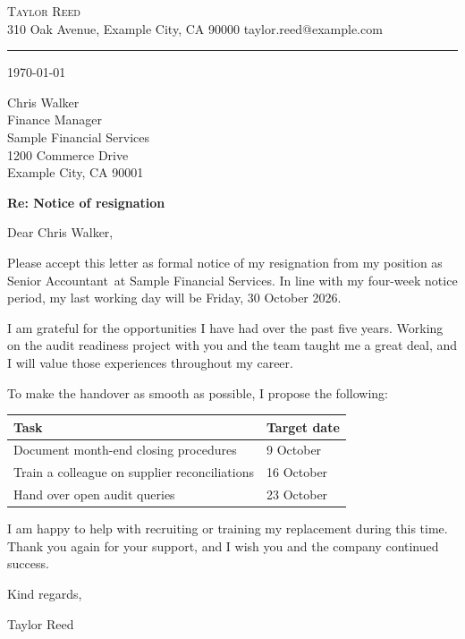 \documentclass[12pt]{article}
\newcommand{\employee}{Taylor Reed}
\newcommand{\position}{Senior Accountant}
\newcommand{\manager}{Chris Walker}
\newcommand{\employer}{Sample Financial Services}
\newcommand{\lastday}{Friday, 30 October 2026}
\begin{document}
\begin{center}
  {\Large\scshape \employee}\\[2pt]
  {\color{slate}\small 310 Oak Avenue, Example City, CA 90000 \quad taylor.reed@example.com}
\end{center}
\vspace{-0.6em}
{\color{slate}\rule{\textwidth}{0.6pt}}

\today

\manager\\
Finance Manager\\
\employer\\
1200 Commerce Drive\\
Example City, CA 90001

\textbf{Re: Notice of resignation}

Dear \manager,

Please accept this letter as formal notice of my resignation from my position as \position\ at \employer. In line with my four-week notice period, my last working day will be \lastday.

I am grateful for the opportunities I have had over the past five years. Working on the audit readiness project with you and the team taught me a great deal, and I will value those experiences throughout my career.

To make the handover as smooth as possible, I propose the following:

\begin{tabular}{@{}p{}l@{}}
  \toprule
  \textbf{Task} & \textbf{Target date} \\
  \midrule
  Document month-end closing procedures & 9 October \\
  Train a colleague on supplier reconciliations & 16 October \\
  Hand over open audit queries & 23 October \\
  \bottomrule
\end{tabular}

I am happy to help with recruiting or training my replacement during this time. Thank you again for your support, and I wish you and the company continued success.

Kind regards,

\vspace{2.5em}
\employee
\end{document}
